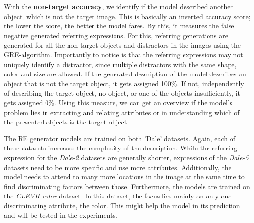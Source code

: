 With the \textbf{non-target accuracy}, we identify if the model described another object, which is not the target image.
This is basically an inverted accuracy score; the lower the score, the better the model fares.
By this, it measures the false negative generated referring expressions.
For this, referring generations are generated for all the non-target objects and distractors in the images using the GRE-algorithm.
Importantly to notice is that the referring expressions may not uniquely identify a distractor, since multiple distractors with the same shape, color and size are allowed.
If the generated description of the model describes an object that is not the target object, it gets assigned 100\%.
If not, independently of describing the target object, no object, or one of the objects insufficiently, it gets assigned 0\%.
Using this measure, we can get an overview if the model's problem lies in extracting and relating attributes or in understanding which of the presented objects is the target object.

The RE generator models are trained on both 'Dale' datasets.
Again, each of these datasets increases the complexity of the description.
While the referring expression for the \emph{Dale-2} datasets are generally shorter, expressions of the \emph{Dale-5} datasets need to be more specific and use more attributes.
Additionally, the model needs to attend to many more locations in the image at the same time to find discriminating factors between those.
Furthermore, the models are trained on the \emph{CLEVR color} dataset.
In this dataset, the focus lies mainly on only one discriminating attribute, the color.
This might help the model in its prediction and will be tested in the experiments.

